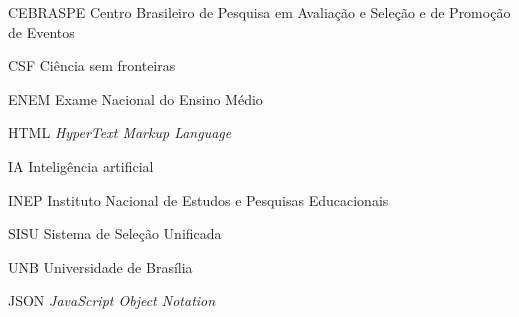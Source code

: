 \begin{basedescript}{\desclabelstyle{\pushlabel}\desclabelwidth{6em}}
\item[{CEBRASPE}] Centro Brasileiro de Pesquisa em Avaliação e Seleção e de Promoção de Eventos%
\item[{CSF}] Ciência sem fronteiras%
\item[{ENEM}] Exame Nacional do Ensino Médio%
\item[{HTML}] \textit{HyperText Markup Language}%
\item[{IA}] Inteligência artificial%
\item[{INEP}] Instituto Nacional de Estudos e Pesquisas Educacionais%
\item[{SISU}] Sistema de Seleção Unificada%
\item[{UNB}] Universidade de Brasília%
\item[{JSON}] \textit{JavaScript Object Notation}%
\end{basedescript}